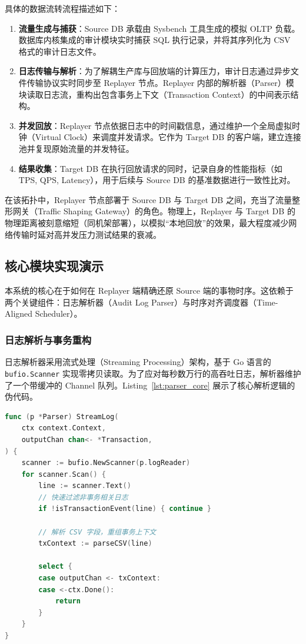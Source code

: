 具体的数据流转流程描述如下：

\begin{enumerate}
    \item \textbf{流量生成与捕获}：Source DB 承载由 Sysbench \cite{sysbench} 工具生成的模拟 OLTP 负载。数据库内核集成的审计模块实时捕获 SQL 执行记录，并将其序列化为 CSV 格式的审计日志文件。
    
    \item \textbf{日志传输与解析}：为了解耦生产库与回放端的计算压力，审计日志通过异步文件传输协议实时同步至 Replayer 节点。Replayer 内部的解析器（Parser）模块读取日志流，重构出包含事务上下文（Transaction Context）的中间表示结构。
    
    \item \textbf{并发回放}：Replayer 节点依据日志中的时间戳信息，通过维护一个全局虚拟时钟（Virtual Clock）来调度并发请求。它作为 Target DB 的客户端，建立连接池\cite{pgbouncer}并复现原始流量的并发特征。
    
    \item \textbf{结果收集}：Target DB 在执行回放请求的同时，记录自身的性能指标（如 TPS, QPS, Latency），用于后续与 Source DB 的基准数据进行一致性比对。
\end{enumerate}

在该拓扑中，Replayer 节点部署于 Source DB 与 Target DB 之间，充当了流量整形网关（Traffic Shaping Gateway）的角色。物理上，Replayer 与 Target DB 的物理距离被刻意缩短（同机架部署），以模拟“本地回放”的效果，最大程度减少网络传输时延对高并发压力测试结果的衰减。
\subsection{核心模块实现演示}
本系统的核心在于如何在 Replayer 端精确还原 Source 端的事物时序。这依赖于两个关键组件：日志解析器（Audit Log Parser）与时序对齐调度器（Time-Aligned Scheduler）。

\subsubsection{日志解析与事务重构}
日志解析器采用流式处理（Streaming Processing）架构，基于 Go 语言的 \texttt{bufio.Scanner} 实现零拷贝读取。为了应对每秒数万行的高吞吐日志，解析器维护了一个带缓冲的 Channel 队列。Listing~\ref{lst:parser_core} 展示了核心解析逻辑的伪代码。

\begin{lstlisting}[language=Go, caption=基于 Channel 的无锁日志解析伪代码, label=lst:parser_core]
func (p *Parser) StreamLog(
    ctx context.Context, 
    outputChan chan<- *Transaction,
) {
    scanner := bufio.NewScanner(p.logReader)
    for scanner.Scan() {
        line := scanner.Text()
        // 快速过滤非事务相关日志
        if !isTransactionEvent(line) { continue }
        
        // 解析 CSV 字段，重组事务上下文
        txContext := parseCSV(line)
        
        select {
        case outputChan <- txContext:
        case <-ctx.Done():
            return
        }
    }
}
\end{lstlisting}

